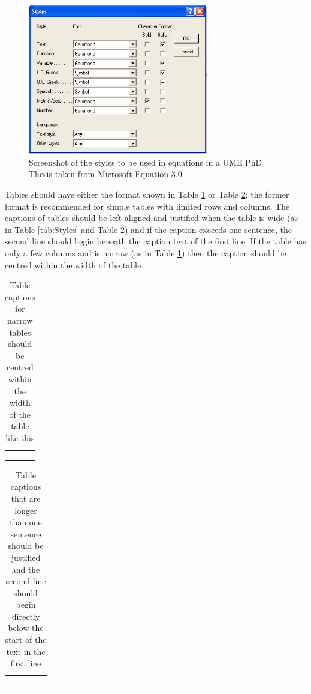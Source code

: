 \begin{figure}[hbt!]
    \centering
    \includegraphics[width=0.7\textwidth]{Figures/Equation_Style.png}
    \caption{Screenshot of the styles to be used in equations in a UME PhD Thesis taken from Microsoft Equation 3.0}
    \label{fig:style_of_symbols}
\end{figure}

Tables should have either the format shown in Table \ref{tab:empty_narrow} or Table \ref{tab:empty_wide}; the former format is recommended for simple tables with limited rows and columns. The captions of tables should be left-aligned and justified when the table is wide (as in Table \ref{tab:Styles} and Table \ref{tab:empty_wide}) and if the caption exceeds one sentence, the second line should begin beneath the caption text of the first line. If the table has only a few columns and is narrow (as in Table \ref{tab:empty_narrow}) then the caption should be centred within the width of the table. 

\begin{table}[hbtp]
  \centering
  \captionsetup{width=10.7cm} %
  \caption{Table captions for narrow tables should be centred within the width of the table like this}
    \begin{tabular}{m{2.1cm} m{5cm} m{2.1cm}}
    \hline
     & & \\
    \hline
     & & \\
     & & \\
     & & \\
     \hline
    \end{tabular}
  \label{tab:empty_narrow}
\end{table}%
\begin{table}[hbtp]
  \centering
  \caption{Table captions that are longer than one sentence should be justified and the second line should begin directly below the start of the text in the first line} 
    \begin{tabular}{|m{2.1cm}|m{2.1cm}|m{2.1cm}|m{2.1cm}|m{2.1cm}|}
    \hline
     & & & & \\
    \hline
     & & & & \\
     \hline
     & & & & \\
     \hline
     & & & & \\
     \hline
     & & & & \\
     \hline
    \end{tabular}
  \label{tab:empty_wide}
\end{table}%

